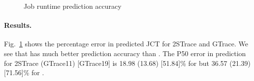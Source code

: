 {\begin{figure}[tp]
\centering
{}
\hspace{-0.25in}
\hspace{-0.25in}
\vspace{-0.15in}
	\caption{Job runtime prediction accuracy }
\vspace{-0.15in}
\label{fig:sim:estimationAccuracy}
\end{figure}

\paragraph{Results.}
{Fig.~\ref{fig:sim:estimationAccuracy} shows the percentage error in predicted JCT for 
  2STrace and GTrace.
}
{We see that \slearn has much better prediction accuracy than
\primarybasepredict.} The P50 error in prediction for 2STrace (GTrace11) [GTrace19] is 18.98
(13.68) [51.84]\% for \namepredict but 36.57 (21.39) [71.56]\% for \primarybasepredict.

}
